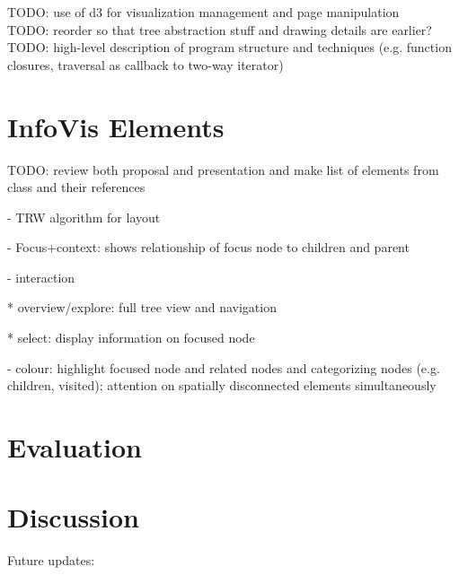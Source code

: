 \documentclass[conference]{IEEEtran}
\begin{document}
TODO: use of d3 for visualization management and page manipulation \\

TODO: reorder so that tree abstraction stuff and drawing details are earlier? \\

TODO: high-level description of program structure and techniques (e.g. function closures, traversal as callback to two-way iterator) \\


\section{InfoVis Elements}


TODO: review both proposal and presentation and make list of elements from class and their references

- TRW algorithm for layout

- Focus+context: shows relationship of focus node to children and parent

- interaction

  * overview/explore: full tree view and navigation

  * select: display information on focused node

- colour: highlight focused node and related nodes and categorizing nodes (e.g. children, visited); attention on spatially disconnected elements simultaneously

\section{Evaluation}


\section{Discussion}


Future updates:
\end{document}
